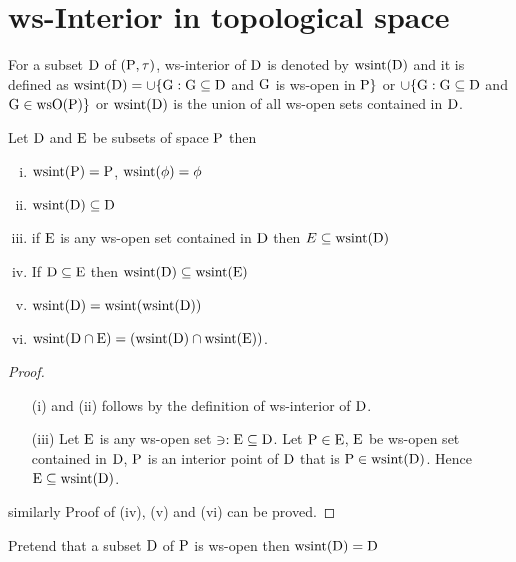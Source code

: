 \section{ws-Interior in topological space}

\begin{dfn}\label{defi2.4.3}
For a subset $\mathrm{D}$ of $(\mathrm{P},\tau)$, ws-interior of $\mathrm{D}$ is denoted by $\mathrm{wsint}(\mathrm{D})$ and it is defined as $\mathrm{wsint}(\mathrm{D})= \cup \{\mathrm{G}: \mathrm{G}\subseteq \mathrm{D}$ and $\mathrm{G}$ is ws-open in $\mathrm{P}\}$ or $\cup \{\mathrm{G}: \mathrm{G}\subseteq \mathrm{D}$ and $\mathrm{G} \in \mathrm{ws} \mathrm{O}(\mathrm{P})\}$ or $\mathrm{wsint}(\mathrm{D})$ is the union of all ws-open sets contained in $\mathrm{D}$.
\end{dfn}

\begin{thm}\label{thm2.4.4}
Let $\mathrm{D}$ and $\mathrm{E}$  be subsets of space $\mathrm{P}$ then
\begin{enumerate}[(i)]
\item $\mathrm{wsint} (\mathrm{P})=\mathrm{P}$, $\mathrm{wsint}(\phi)=\phi$
\item $\mathrm{wsint}(\mathrm{D})\subseteq \mathrm{D}$
\item if $\mathrm{E}$ is any ws-open set contained in $\mathrm{D}$ then $E\subseteq \mathrm{wsint}(\mathrm{D})$
\item If $\mathrm{D}\subseteq \mathrm{E}$ then $\mathrm{wsint}(\mathrm{D})\subseteq \mathrm{wsint}(\mathrm{E})$
\item $\mathrm{wsint}(\mathrm{D})=\mathrm{wsint}(\mathrm{wsint}(\mathrm{D}))$
\item $\mathrm{wsint}(\mathrm{D}\cap \mathrm{E})=(\mathrm{wsint}(\mathrm{D})\cap \mathrm{wsint}(\mathrm{E}))$.
\end{enumerate}
\end{thm}

\begin{proof}
\begin{itemize}
\item[(i)] and (ii) follows by the definition of ws-interior of $\mathrm{D}$.
\item[(iii)] Let $\mathrm{E}$ is any ws-open set $\ni: \mathrm{E}\subseteq \mathrm{D}$. Let $\mathrm{P}\in\mathrm{E}$, $\mathrm{E}$  be ws-open set contained in $\mathrm{D}$, $\mathrm{P}$ is an interior point of $\mathrm{D}$ that is $\mathrm{P}\in \mathrm{wsint}(\mathrm{D})$. Hence $\mathrm{E}\subseteq \mathrm{wsint}(\mathrm{D})$.
\end{itemize}
similarly Proof of (iv), (v) and (vi) can be proved.
\end{proof}

\begin{thm}\label{thm2.4.5}
Pretend that a subset $\mathrm{D}$ of $\mathrm{P}$ is ws-open then $\mathrm{wsint}(\mathrm{D})=\mathrm{D}$
\end{thm}


